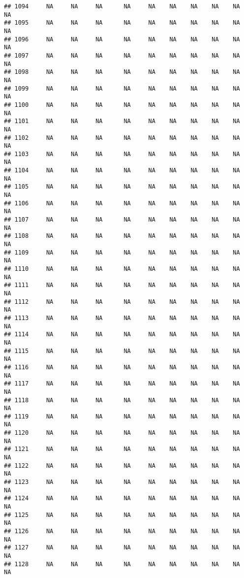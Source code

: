 \documentclass{article}\usepackage{graphicx, color}
\makeatletter
\newenvironment{kframe}{%
 \def\at@end@of@kframe{}%
 \ifinner\ifhmode%
  \def\at@end@of@kframe{\end{minipage}}%
  \begin{minipage}{\columnwidth}%
 \fi\fi%
 \def\FrameCommand##1{\hskip\@totalleftmargin \hskip-\fboxsep
 \colorbox{shadecolor}{##1}\hskip-\fboxsep
     \hskip-\linewidth \hskip-\@totalleftmargin \hskip\columnwidth}%
 \MakeFramed {\advance\hsize-\width
   \@totalleftmargin\z@ \linewidth\hsize
   \@setminipage}}%
 {\par\unskip\endMakeFramed%
 \at@end@of@kframe}
\newenvironment{knitrout}{}{} %
\makeatother
\begin{document}
\begin{knitrout}
\begin{kframe}
\begin{verbatim}
## 1094     NA     NA     NA      NA     NA    NA    NA    NA    NA     NA
## 1095     NA     NA     NA      NA     NA    NA    NA    NA    NA     NA
## 1096     NA     NA     NA      NA     NA    NA    NA    NA    NA     NA
## 1097     NA     NA     NA      NA     NA    NA    NA    NA    NA     NA
## 1098     NA     NA     NA      NA     NA    NA    NA    NA    NA     NA
## 1099     NA     NA     NA      NA     NA    NA    NA    NA    NA     NA
## 1100     NA     NA     NA      NA     NA    NA    NA    NA    NA     NA
## 1101     NA     NA     NA      NA     NA    NA    NA    NA    NA     NA
## 1102     NA     NA     NA      NA     NA    NA    NA    NA    NA     NA
## 1103     NA     NA     NA      NA     NA    NA    NA    NA    NA     NA
## 1104     NA     NA     NA      NA     NA    NA    NA    NA    NA     NA
## 1105     NA     NA     NA      NA     NA    NA    NA    NA    NA     NA
## 1106     NA     NA     NA      NA     NA    NA    NA    NA    NA     NA
## 1107     NA     NA     NA      NA     NA    NA    NA    NA    NA     NA
## 1108     NA     NA     NA      NA     NA    NA    NA    NA    NA     NA
## 1109     NA     NA     NA      NA     NA    NA    NA    NA    NA     NA
## 1110     NA     NA     NA      NA     NA    NA    NA    NA    NA     NA
## 1111     NA     NA     NA      NA     NA    NA    NA    NA    NA     NA
## 1112     NA     NA     NA      NA     NA    NA    NA    NA    NA     NA
## 1113     NA     NA     NA      NA     NA    NA    NA    NA    NA     NA
## 1114     NA     NA     NA      NA     NA    NA    NA    NA    NA     NA
## 1115     NA     NA     NA      NA     NA    NA    NA    NA    NA     NA
## 1116     NA     NA     NA      NA     NA    NA    NA    NA    NA     NA
## 1117     NA     NA     NA      NA     NA    NA    NA    NA    NA     NA
## 1118     NA     NA     NA      NA     NA    NA    NA    NA    NA     NA
## 1119     NA     NA     NA      NA     NA    NA    NA    NA    NA     NA
## 1120     NA     NA     NA      NA     NA    NA    NA    NA    NA     NA
## 1121     NA     NA     NA      NA     NA    NA    NA    NA    NA     NA
## 1122     NA     NA     NA      NA     NA    NA    NA    NA    NA     NA
## 1123     NA     NA     NA      NA     NA    NA    NA    NA    NA     NA
## 1124     NA     NA     NA      NA     NA    NA    NA    NA    NA     NA
## 1125     NA     NA     NA      NA     NA    NA    NA    NA    NA     NA
## 1126     NA     NA     NA      NA     NA    NA    NA    NA    NA     NA
## 1127     NA     NA     NA      NA     NA    NA    NA    NA    NA     NA
## 1128     NA     NA     NA      NA     NA    NA    NA    NA    NA     NA

\end{verbatim}
\end{kframe}
\end{knitrout}
\end{document}
